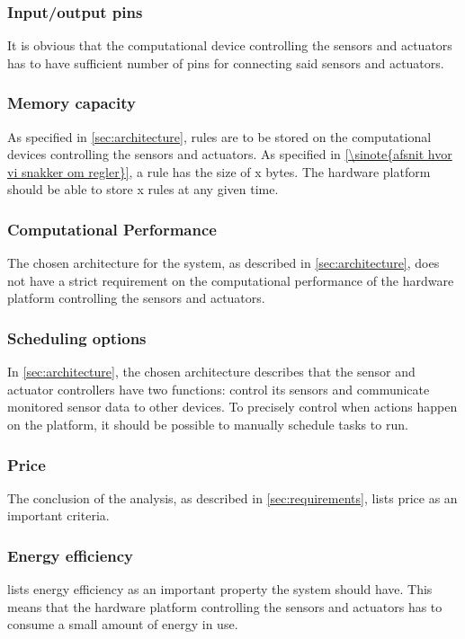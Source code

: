 \subsubsection{Input/output pins}
It is obvious that the computational device controlling the sensors and actuators has to have sufficient number of pins for connecting said sensors and actuators.

\subsubsection{Memory capacity}
As specified in \cref{sec:architecture}, rules are to be stored on the computational devices controlling the sensors and actuators. As specified in \cref{\sinote{afsnit hvor vi snakker om regler}}, a rule has the size of x  bytes. The hardware platform should be able to store x  rules at any given time.

\subsubsection{Computational Performance}
The chosen architecture for the system, as described in \cref{sec:architecture}, does not have a strict requirement on the computational performance of the hardware platform controlling the sensors and actuators.

\subsubsection{Scheduling options}
In \cref{sec:architecture}, the chosen architecture describes that the sensor and actuator controllers have two functions: control its sensors and communicate monitored sensor data to other devices. To precisely control when actions happen on the platform, it should be possible to manually schedule tasks to run.

\subsubsection{Price}
The conclusion of the analysis, as described in \cref{sec:requirements}, lists price as an important criteria.

\subsubsection{Energy efficiency}
 lists energy efficiency as an important property the system should have. This means that the hardware platform controlling the sensors and actuators has to consume a small amount of energy in use.


